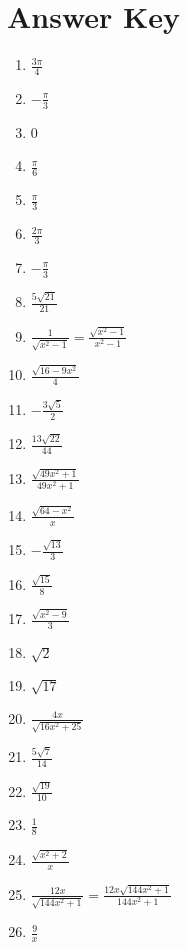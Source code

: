 \section{Answer Key}

\begin{enumerate}
	\item $\frac{3\pi}{4}$
	\item $-\frac{\pi}{3}$
	\item 0
	\item $\frac{\pi}{6}$
	\item $\frac{\pi}{3}$
	\item $\frac{2\pi}{3}$
	\item $-\frac{\pi}{3}$
    \item $\frac{5\sqrt{21}}{21}$
    \item $\frac{1}{\sqrt{x^2-1}} = \frac{\sqrt{x^2-1}}{x^2-1}$
    \item $\frac{\sqrt{16-9x^2}}{4}$
    \item $-\frac{3\sqrt{5}}{2}$
    \item $\frac{13\sqrt{22}}{44}$
    \item $\frac{\sqrt{49x^2+1}}{49x^2+1}$
    \item $\frac{\sqrt{64-x^2}}{x}$
    \item $-\frac{\sqrt{13}}{3}$
    \item $\frac{\sqrt{15}}{8}$
    \item $\frac{\sqrt{x^2-9}}{3}$
    \item $\sqrt{2}$
    \item $\sqrt{17}$
    \item $\frac{4x}{\sqrt{16x^2+25}}$
    \item $\frac{5\sqrt{7}}{14}$
    \item $\frac{\sqrt{19}}{10}$
    \item $\frac{1}{8}$
    \item $\frac{\sqrt{x^2+2}}{x}$
    \item $\frac{12x}{\sqrt{144x^2+1}} = \frac{12x\sqrt{144x^2+1}}{144x^2+1}$
    \item $\frac{9}{x}$
\end{enumerate}
